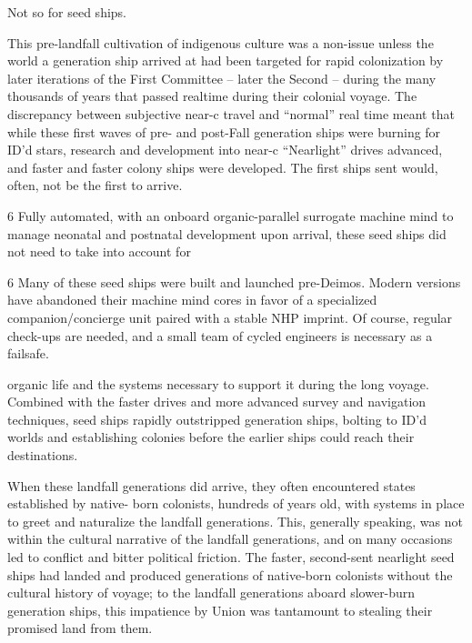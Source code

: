 Not so for seed ships. 
 

This pre-landfall cultivation of indigenous culture was a non-issue unless the world a generation  
ship arrived at had been targeted for rapid colonization by later iterations of the First Committee  
-- later the Second -- during the many thousands of years that passed realtime during their  
colonial voyage. The discrepancy between subjective near-c travel and “normal” real time meant  
that while these first waves of pre- and post-Fall generation ships were burning for ID’d stars,  
research and development into near-c “Nearlight” drives advanced, and faster and faster colony  
ships were developed. The first ships sent would, often, not be the first to arrive.  
 

                                                                                          6 
Fully automated, with an onboard organic-parallel surrogate machine mind  to manage neonatal  
and postnatal development upon arrival, these seed ships did not need to take into account for  

6 Many of these seed ships were built and launched pre-Deimos. Modern versions have abandoned their  
machine mind cores in favor of a specialized companion/concierge unit paired with a stable NHP imprint. Of  
course, regular check-ups are needed, and a small team of cycled engineers is necessary as a failsafe.  

                                                                                                                 


organic life and the systems necessary to support it during the long voyage. Combined with the  
faster drives and more advanced survey and navigation techniques, seed ships rapidly  
outstripped generation ships, bolting to ID’d worlds and establishing colonies before the earlier  
ships could reach their destinations.
 

When these landfall generations did arrive, they often encountered states established by native- 
born colonists, hundreds of years old, with systems in place to greet and naturalize the landfall  
generations. This, generally speaking, was not within the cultural narrative of the landfall  
generations, and on many occasions led to conflict and bitter political friction. The faster,  
second-sent nearlight seed ships had landed and produced generations of native-born colonists  
without the cultural history of voyage; to the landfall generations aboard slower-burn generation  
ships, this impatience by Union was tantamount to stealing their promised land from them. 
 

